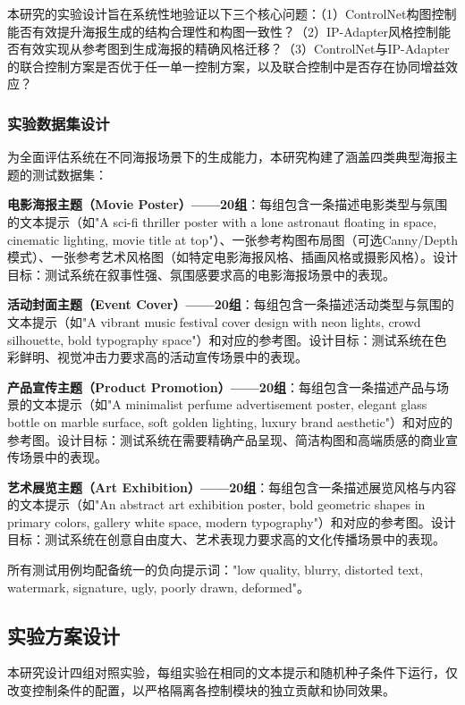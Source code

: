 \documentclass[12pt,a4paper]{ctexart}
\newcommand{\controlnet}{ControlNet}
\newcommand{\ipadapter}{IP-Adapter}
\begin{document}
本研究的实验设计旨在系统性地验证以下三个核心问题：（1）\controlnet{}构图控制能否有效提升海报生成的结构合理性和构图一致性？（2）\ipadapter{}风格控制能否有效实现从参考图到生成海报的精确风格迁移？（3）\controlnet{}与\ipadapter{}的联合控制方案是否优于任一单一控制方案，以及联合控制中是否存在协同增益效应？

\subsubsection{实验数据集设计}

为全面评估系统在不同海报场景下的生成能力，本研究构建了涵盖四类典型海报主题的测试数据集：

\textbf{电影海报主题（Movie Poster）——20组}：每组包含一条描述电影类型与氛围的文本提示（如"A sci-fi thriller poster with a lone astronaut floating in space, cinematic lighting, movie title at top"）、一张参考构图布局图（可选Canny/Depth模式）、一张参考艺术风格图（如特定电影海报风格、插画风格或摄影风格）。设计目标：测试系统在叙事性强、氛围感要求高的电影海报场景中的表现。

\textbf{活动封面主题（Event Cover）——20组}：每组包含一条描述活动类型与氛围的文本提示（如"A vibrant music festival cover design with neon lights, crowd silhouette, bold typography space"）和对应的参考图。设计目标：测试系统在色彩鲜明、视觉冲击力要求高的活动宣传场景中的表现。

\textbf{产品宣传主题（Product Promotion）——20组}：每组包含一条描述产品与场景的文本提示（如"A minimalist perfume advertisement poster, elegant glass bottle on marble surface, soft golden lighting, luxury brand aesthetic"）和对应的参考图。设计目标：测试系统在需要精确产品呈现、简洁构图和高端质感的商业宣传场景中的表现。

\textbf{艺术展览主题（Art Exhibition）——20组}：每组包含一条描述展览风格与内容的文本提示（如"An abstract art exhibition poster, bold geometric shapes in primary colors, gallery white space, modern typography"）和对应的参考图。设计目标：测试系统在创意自由度大、艺术表现力要求高的文化传播场景中的表现。

所有测试用例均配备统一的负向提示词："low quality, blurry, distorted text, watermark, signature, ugly, poorly drawn, deformed"。

\subsection{实验方案设计}

本研究设计四组对照实验，每组实验在相同的文本提示和随机种子条件下运行，仅改变控制条件的配置，以严格隔离各控制模块的独立贡献和协同效果。
\end{document}
